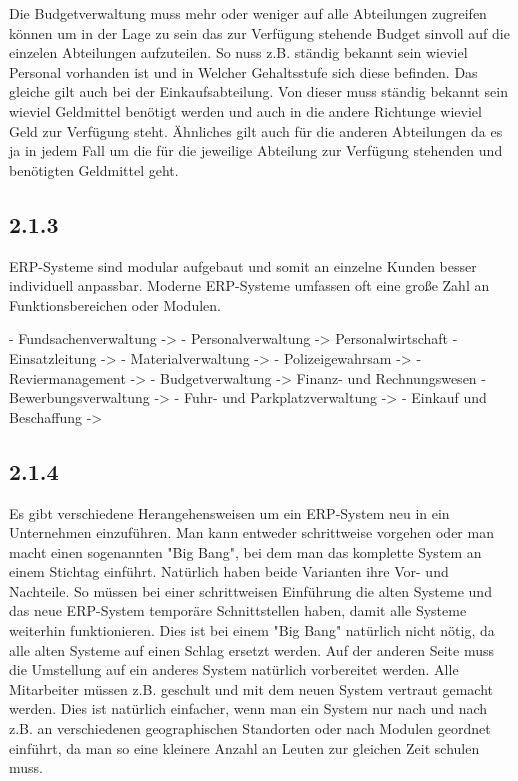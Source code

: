 \documentclass[12pt,utf8]{scrartcl}
\begin{document}
Die Budgetverwaltung muss mehr oder weniger auf alle Abteilungen zugreifen können um in der Lage zu sein das zur Verfügung stehende Budget sinvoll auf die einzelen Abteilungen aufzuteilen. So nuss z.B. ständig bekannt sein wieviel Personal vorhanden ist und in Welcher Gehaltsstufe sich diese befinden. Das gleiche gilt auch bei der Einkaufsabteilung. Von dieser muss ständig bekannt sein wieviel Geldmittel benötigt werden und auch in die andere Richtunge wieviel Geld zur Verfügung steht. Ähnliches gilt auch für die anderen Abteilungen da es ja in jedem Fall um die für die jeweilige Abteilung zur Verfügung stehenden und benötigten Geldmittel geht.




\subsection*{2.1.3}\label{Aufgabe 2.1.3}

ERP-Systeme sind modular aufgebaut und somit an einzelne Kunden besser individuell anpassbar. Moderne ERP-Systeme umfassen oft eine große Zahl an Funktionsbereichen oder Modulen. 

- Fundsachenverwaltung -> 
- Personalverwaltung -> Personalwirtschaft
- Einsatzleitung -> 
- Materialverwaltung -> 
- Polizeigewahrsam -> 
- Reviermanagement -> 
- Budgetverwaltung -> Finanz- und Rechnungswesen
- Bewerbungsverwaltung -> 
- Fuhr- und Parkplatzverwaltung -> 
- Einkauf und Beschaffung -> 

\subsection*{2.1.4}

Es gibt verschiedene Herangehensweisen um ein ERP-System neu in ein Unternehmen einzuführen. Man kann entweder schrittweise vorgehen oder man macht einen sogenannten "Big Bang", bei dem man das komplette System an einem Stichtag einführt. Natürlich haben beide Varianten ihre Vor- und Nachteile. So müssen bei einer schrittweisen Einführung die alten Systeme und das neue ERP-System temporäre Schnittstellen haben, damit alle Systeme weiterhin funktionieren. Dies ist bei einem "Big Bang" natürlich nicht nötig, da alle alten Systeme auf einen Schlag ersetzt werden. Auf der anderen Seite muss die Umstellung auf ein anderes System natürlich vorbereitet werden. Alle Mitarbeiter müssen z.B. geschult und mit dem neuen System vertraut gemacht werden. Dies ist natürlich einfacher, wenn man ein System nur nach und nach z.B. an verschiedenen geographischen Standorten oder nach Modulen geordnet einführt, da man so eine kleinere Anzahl an Leuten zur gleichen Zeit schulen muss\cite{Jacob2008}. 
\end{document}
